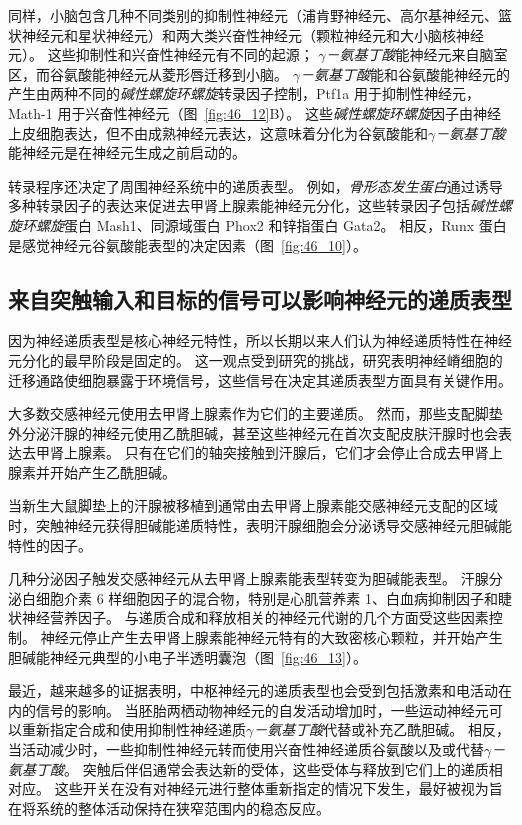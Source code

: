 同样，小脑包含几种不同类别的抑制性神经元（浦肯野神经元、高尔基神经元、篮状神经元和星状神经元）和两大类兴奋性神经元（颗粒神经元和大小脑核神经元）。
这些抑制性和兴奋性神经元有不同的起源；
\textit{$\gamma$－氨基丁酸}能神经元来自脑室区，而谷氨酸能神经元从菱形唇迁移到小脑。
\textit{$\gamma$－氨基丁酸}能和谷氨酸能神经元的产生由两种不同的\textit{碱性螺旋环螺旋}转录因子控制，Ptf1a 用于抑制性神经元，Math-1 用于兴奋性神经元（图~\ref{fig:46_12}B）。
这些\textit{碱性螺旋环螺旋}因子由神经上皮细胞表达，但不由成熟神经元表达，这意味着分化为谷氨酸能和\textit{$\gamma$－氨基丁酸}能神经元是在神经元生成之前启动的。


转录程序还决定了周围神经系统中的递质表型。
例如，\textit{骨形态发生蛋白}通过诱导多种转录因子的表达来促进去甲肾上腺素能神经元分化，这些转录因子包括\textit{碱性螺旋环螺旋}蛋白 Mash1、同源域蛋白 Phox2 和锌指蛋白 Gata2。
相反，Runx 蛋白是感觉神经元谷氨酸能表型的决定因素（图~\ref{fig:46_10}）。



\subsection{来自突触输入和目标的信号可以影响神经元的递质表型}

因为神经递质表型是核心神经元特性，所以长期以来人们认为神经递质特性在神经元分化的最早阶段是固定的。
这一观点受到研究的挑战，研究表明神经嵴细胞的迁移通路使细胞暴露于环境信号，这些信号在决定其递质表型方面具有关键作用。


大多数交感神经元使用去甲肾上腺素作为它们的主要递质。
然而，那些支配脚垫外分泌汗腺的神经元使用乙酰胆碱，甚至这些神经元在首次支配皮肤汗腺时也会表达去甲肾上腺素。
只有在它们的轴突接触到汗腺后，它们才会停止合成去甲肾上腺素并开始产生乙酰胆碱。


当新生大鼠脚垫上的汗腺被移植到通常由去甲肾上腺素能交感神经元支配的区域时，突触神经元获得胆碱能递质特性，表明汗腺细胞会分泌诱导交感神经元胆碱能特性的因子。


几种分泌因子触发交感神经元从去甲肾上腺素能表型转变为胆碱能表型。
汗腺分泌白细胞介素 6 样细胞因子的混合物，特别是心肌营养素 1、白血病抑制因子和睫状神经营养因子。
与递质合成和释放相关的神经元代谢的几个方面受这些因素控制。
神经元停止产生去甲肾上腺素能神经元特有的大致密核心颗粒，并开始产生胆碱能神经元典型的小电子半透明囊泡（图~\ref{fig:46_13}）。


最近，越来越多的证据表明，中枢神经元的递质表型也会受到包括激素和电活动在内的信号的影响。
当胚胎两栖动物神经元的自发活动增加时，一些运动神经元可以重新指定合成和使用抑制性神经递质\textit{$\gamma$－氨基丁酸}代替或补充乙酰胆碱。
相反，当活动减少时，一些抑制性神经元转而使用兴奋性神经递质谷氨酸以及或代替\textit{$\gamma$－氨基丁酸}。
突触后伴侣通常会表达新的受体，这些受体与释放到它们上的递质相对应。
这些开关在没有对神经元进行整体重新指定的情况下发生，最好被视为旨在将系统的整体活动保持在狭窄范围内的稳态反应。


